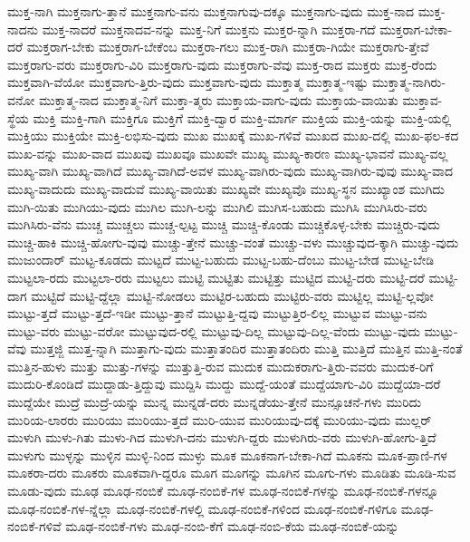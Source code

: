 {ಮುಕ್ತ-ನಾಗಿ
ಮುಕ್ತನಾಗು-ತ್ತಾನೆ
ಮುಕ್ತನಾಗು-ವನು
ಮುಕ್ತನಾಗುವು-ದಕ್ಕೂ
ಮುಕ್ತನಾಗು-ವುದು
ಮುಕ್ತ-ನಾದ
ಮುಕ್ತ-ನಾದನು
ಮುಕ್ತ-ನಾದರೆ
ಮುಕ್ತನಾದವ-ನನ್ನು
ಮುಕ್ತ-ನಿಗೆ
ಮುಕ್ತನು
ಮುಕ್ತರ-ನ್ನಾಗಿ
ಮುಕ್ತರಾ-ಗದೆ
ಮುಕ್ತರಾಗ-ಬೇಕಾ-ದರೆ
ಮುಕ್ತರಾಗ-ಬೇಕು
ಮುಕ್ತರಾಗ-ಬೇಕೆಂಬ
ಮುಕ್ತರಾ-ಗಲು
ಮುಕ್ತ-ರಾಗಿ
ಮುಕ್ತರಾ-ಗಿಯೇ
ಮುಕ್ತರಾಗು-ತ್ತೇವೆ
ಮುಕ್ತರಾಗು-ವರು
ಮುಕ್ತರಾಗು-ವಿರಿ
ಮುಕ್ತರಾಗು-ವುದು
ಮುಕ್ತರಾಗು-ವೆವು
ಮುಕ್ತ-ರಾದ
ಮುಕ್ತರು
ಮುಕ್ತ-ರೆಂದು
ಮುಕ್ತವಾಗಿ-ವೆಯೋ
ಮುಕ್ತವಾಗು-ತ್ತಿರು-ವುದು
ಮುಕ್ತವಾಗು-ವುದು
ಮುಕ್ತಾತ್ಮ
ಮುಕ್ತಾತ್ಮ-ಇಷ್ಟು
ಮುಕ್ತಾತ್ಮ-ನಾಗಿರು-ವನೋ
ಮುಕ್ತಾತ್ಮ-ನಾದ
ಮುಕ್ತಾತ್ಮ-ನಿಗೆ
ಮುಕ್ತಾ-ತ್ಮರು
ಮುಕ್ತಾಯ-ವಾಗು-ವುದು
ಮುಕ್ತಾಯ-ವಾಯಿತು
ಮುಕ್ತಾವ-ಸ್ಥೆಯ
ಮುಕ್ತಿ
ಮುಕ್ತಿ-ಗಾಗಿ
ಮುಕ್ತಿಗೂ
ಮುಕ್ತಿಗೆ
ಮುಕ್ತಿ-ದ್ವಾರ
ಮುಕ್ತಿ-ಮಾರ್ಗ
ಮುಕ್ತಿಯ
ಮುಕ್ತಿ-ಯನ್ನು
ಮುಕ್ತಿ-ಯಲ್ಲಿ
ಮುಕ್ತಿಯು
ಮುಕ್ತಿಯೇ
ಮುಕ್ತಿ-ಲಭಿಸು-ವುದು
ಮುಖ
ಮುಖಕ್ಕೆ
ಮುಖ-ಗಳಿವೆ
ಮುಖದ
ಮುಖ-ದಲ್ಲಿ
ಮುಖ-ಫಲ-ಕದ
ಮುಖ-ವನ್ನು
ಮುಖ-ವಾದ
ಮುಖವು
ಮುಖವೂ
ಮುಖವೇ
ಮುಖ್ಯ
ಮುಖ್ಯ-ಕಾರಣ
ಮುಖ್ಯ-ಭಾವನೆ
ಮುಖ್ಯ-ವಲ್ಲ
ಮುಖ್ಯ-ವಾಗಿ
ಮುಖ್ಯ-ವಾಗಿದೆ
ಮುಖ್ಯ-ವಾಗಿದೆ-ಅವಳ
ಮುಖ್ಯ-ವಾಗಿರು-ವುದು
ಮುಖ್ಯ-ವಾಗಿರು-ವುವು
ಮುಖ್ಯ-ವಾದ
ಮುಖ್ಯ-ವಾದುದು
ಮುಖ್ಯ-ವಾದುವೆ
ಮುಖ್ಯ-ವಾಯಿತು
ಮುಖ್ಯವೇ
ಮುಖ್ಯವೊ
ಮುಖ್ಯ-ಸ್ಥನ
ಮುಖ್ಯಾಂಶ
ಮುಗಿದು
ಮುಗಿ-ಯಿತು
ಮುಗಿಯು-ವುದು
ಮುಗಿಲ
ಮುಗಿ-ಲನ್ನು
ಮುಗಿಲಿ
ಮುಗಿಸ-ಬಹುದು
ಮುಗಿಸಿ
ಮುಗಿಸಿರು-ವರು
ಮುಗಿಸಿರು-ವೆನು
ಮುಚ್ಚ
ಮುಚ್ಚಲು
ಮುಚ್ಚ-ಲ್ಪಟ್ಟ
ಮುಚ್ಚಿ
ಮುಚ್ಚಿ-ಕೊಂಡು
ಮುಚ್ಚಿಕೊಳ್ಳ-ಬೇಕು
ಮುಚ್ಚಿರು-ವುದು
ಮುಚ್ಚಿ-ಹಾಕಿ
ಮುಚ್ಚಿ-ಹೋಗು-ವುವು
ಮುಚ್ಚು-ತ್ತೇನೆ
ಮುಚ್ಚು-ವಂತೆ
ಮುಚ್ಚು-ವಳು
ಮುಚ್ಚುವುದ-ಕ್ಕಾಗಿ
ಮುಚ್ಚು-ವುದು
ಮುಜುಂದಾರ್
ಮುಟ್ಟ-ಕೂಡದು
ಮುಟ್ಟದೆ
ಮುಟ್ಟ-ಬಹುದು
ಮುಟ್ಟ-ಬಹು-ದೆಂಬು
ಮುಟ್ಟ-ಬೇಡ
ಮುಟ್ಟ-ಬೇಡಿ
ಮುಟ್ಟಲಾ-ರದು
ಮುಟ್ಟಲಾ-ರರು
ಮುಟ್ಟಲು
ಮುಟ್ಟಿ
ಮುಟ್ಟಿತು
ಮುಟ್ಟಿತ್ತು
ಮುಟ್ಟಿದ
ಮುಟ್ಟಿ-ದರು
ಮುಟ್ಟಿ-ದರೆ
ಮುಟ್ಟಿ-ದಾಗ
ಮುಟ್ಟಿದೆ
ಮುಟ್ಟಿ-ದ್ದೆಲ್ಲಾ
ಮುಟ್ಟಿ-ನೋಡಲು
ಮುಟ್ಟಿರ-ಬಹುದು
ಮುಟ್ಟಿರು-ವರು
ಮುಟ್ಟಿಲ್ಲ
ಮುಟ್ಟಿ-ಲ್ಲವೋ
ಮುಟ್ಟು-ತ್ತದೆ
ಮುಟ್ಟು-ತ್ತದೆ-ಇಡೀ
ಮುಟ್ಟು-ತ್ತಾನೆ
ಮುಟ್ಟುತ್ತಿ-ದ್ದವು
ಮುಟ್ಟುತ್ತಿರ-ಲಿಲ್ಲ
ಮುಟ್ಟುವ
ಮುಟ್ಟು-ವನು
ಮುಟ್ಟು-ವರು
ಮುಟ್ಟು-ವರೋ
ಮುಟ್ಟುವುದ-ರಲ್ಲಿ
ಮುಟ್ಟುವು-ದಿಲ್ಲ
ಮುಟ್ಟುವು-ದಿಲ್ಲ-ವೆಂದು
ಮುಟ್ಟು-ವುದು
ಮುಟ್ಟು-ವೆವು
ಮುತ್ತಜ್ಜಿ
ಮುತ್ತ-ನ್ನಾಗಿ
ಮುತ್ತಾಗು-ವುದು
ಮುತ್ತಾತಂದಿರ
ಮುತ್ತಾತಂದಿರು
ಮುತ್ತಿ
ಮುತ್ತಿದೆ
ಮುತ್ತಿನ
ಮುತ್ತಿ-ನಂತೆ
ಮುತ್ತಿನ-ಹುಳು
ಮುತ್ತು
ಮುತ್ತು-ಗಳನ್ನು
ಮುತ್ತುತ್ತಿ-ರುವ
ಮುದುಕ
ಮುದುಕರಾಗು-ತ್ತಿರು-ವವರು
ಮುದುಕ-ರಿಗೆ
ಮುದುರಿ-ಕೊಂಡಿದೆ
ಮುದ್ದಾಡು-ತ್ತಿದ್ದುವು
ಮುದ್ದಿಸಿ
ಮುದ್ದು
ಮುದ್ದೆ-ಯಂತೆ
ಮುದ್ದೆಯಾಗು-ವಿರಿ
ಮುದ್ದೆಯಾ-ದರೆ
ಮುದ್ದೆಯೇ
ಮುದ್ರೆ
ಮುದ್ರೆ-ಯನ್ನು
ಮುನ್ನ
ಮುನ್ನಡೆ-ದರು
ಮುನ್ನಡೆಯು-ತ್ತೇನೆ
ಮುನ್ಸೂಚನೆ-ಗಳು
ಮುರಿದು
ಮುರಿಯ-ಲಾರರು
ಮುರಿಯು
ಮುರಿಯು-ತ್ತದೆ
ಮುರಿ-ಯುವ
ಮುರಿಯುವು-ದಕ್ಕೆ
ಮುರಿಯು-ವುದು
ಮುಲ್ಲರ್
ಮುಳುಗಿ
ಮುಳು-ಗಿತು
ಮುಳು-ಗಿದ
ಮುಳುಗಿ-ದನು
ಮುಳುಗಿ-ದ್ದರು
ಮುಳುಗಿರು-ವರು
ಮುಳುಗಿ-ಹೋಗು-ತ್ತಿದೆ
ಮುಳುಗು
ಮುಳ್ಳನ್ನು
ಮುಳ್ಳಿನ
ಮುಳ್ಳಿ-ನಿಂದ
ಮುಳ್ಳು
ಮೂಕ
ಮೂಕನಾಗ-ಬೇಕಾ-ಗಿದೆ
ಮೂಕನು
ಮೂಕ-ಪ್ರಾಣಿ-ಗಳ
ಮೂಕರಾ-ದರು
ಮೂಕರು
ಮೂಕವಾಗಿ-ದ್ದರೂ
ಮೂಗ
ಮೂಗನ್ನು
ಮೂಗಿನ
ಮೂಗು-ಗಳು
ಮೂಡಿತು
ಮೂಡಿ-ಸುವ
ಮೂಡು-ವುದು
ಮೂಢ
ಮೂಢ-ನಂಬಿಕೆ
ಮೂಢ-ನಂಬಿಕೆ-ಗಳ
ಮೂಢ-ನಂಬಿಕೆ-ಗಳನ್ನು
ಮೂಢ-ನಂಬಿಕೆ-ಗಳನ್ನೂ
ಮೂಢ-ನಂಬಿಕೆ-ಗಳ-ನ್ನೆಲ್ಲಾ
ಮೂಢ-ನಂಬಿಕೆ-ಗಳಲ್ಲಿ
ಮೂಢ-ನಂಬಿಕೆ-ಗಳಿಂದ
ಮೂಢ-ನಂಬಿಕೆ-ಗಳಿಗೂ
ಮೂಢ-ನಂಬಿಕೆ-ಗಳಿವೆ
ಮೂಢ-ನಂಬಿಕೆ-ಗಳು
ಮೂಢ-ನಂಬಿ-ಕೆಗೆ
ಮೂಢ-ನಂಬಿ-ಕೆಯ
ಮೂಢ-ನಂಬಿಕೆ-ಯನ್ನು
}
